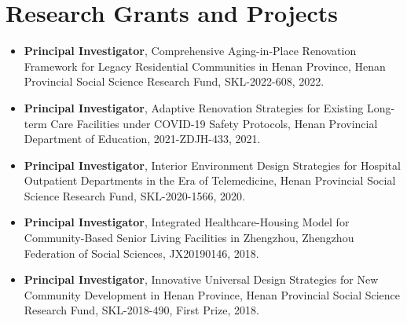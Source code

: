 \documentclass[10pt,a4paper]{article}
\begin{document}
\section*{Research Grants and Projects}
\begin{itemize}
  \item \textbf{Principal Investigator}, Comprehensive Aging-in-Place Renovation Framework for Legacy Residential Communities in Henan Province, Henan Provincial Social Science Research Fund, SKL-2022-608, 2022.
  \item \textbf{Principal Investigator}, Adaptive Renovation Strategies for Existing Long-term Care Facilities under COVID-19 Safety Protocols, Henan Provincial Department of Education, 2021-ZDJH-433, 2021.
  \item \textbf{Principal Investigator}, Interior Environment Design Strategies for Hospital Outpatient Departments in the Era of Telemedicine, Henan Provincial Social Science Research Fund, SKL-2020-1566, 2020.
  \item \textbf{Principal Investigator}, Integrated Healthcare-Housing Model for Community-Based Senior Living Facilities in Zhengzhou, Zhengzhou Federation of Social Sciences, JX20190146, 2018.
  \item \textbf{Principal Investigator}, Innovative Universal Design Strategies for New Community Development in Henan Province, Henan Provincial Social Science Research Fund, SKL-2018-490, First Prize, 2018.
\end{itemize}
\end{document}
